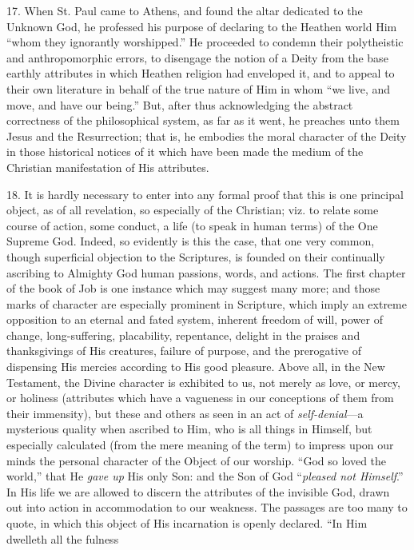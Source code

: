 17. When St. Paul came to Athens, and found the altar dedicated to
the Unknown God, he professed his purpose of declaring to the Heathen
world Him ``whom they ignorantly worshipped.'' He proceeded to
condemn their polytheistic and anthropomorphic errors, to disengage
the notion of a Deity from the base earthly attributes in which
Heathen religion had enveloped it, and to appeal to their own
literature in behalf of the true nature of Him in whom ``we live,
and move, and have our being.'' But, after thus acknowledging the
abstract correctness of the philosophical system, as far as it went,
he preaches unto them Jesus and the Resurrection; that is, he embodies
the moral character of the Deity in those historical notices of it
which have been made the medium of the Christian manifestation of His
attributes.

18. It is hardly necessary to enter into any formal proof that this
is one principal object, as of all revelation, so especially of the
Christian; viz. to relate some course of action, some conduct, a life
(to speak in human terms) of the One Supreme God. Indeed, so evidently
is this the case, that one very common, though superficial objection
to the Scriptures, is founded on their continually ascribing to
Almighty God human passions, words, and actions. The first chapter of
the book of Job is one instance which may suggest many more; and those
marks of character are especially prominent in Scripture, which imply
an extreme opposition to an eternal and fated system, inherent freedom
of will, power of change, long-suffering, placability, repentance,
delight in the praises and thanksgivings of His creatures, failure of
purpose, and the prerogative of dispensing His mercies according to
His good pleasure. Above all, in the New Testament, the Divine
character is exhibited to us, not merely as love, or mercy, or
holiness (attributes which have a vagueness in our conceptions of them
from their immensity), but these and others as seen in an act of \emph{self-denial}—a
mysterious quality when ascribed to Him, who is all things in Himself,
but especially calculated (from the mere meaning of the term) to
impress upon our minds the personal character of the Object of our
worship. ``God so loved the world,'' that He \emph{gave up}
His only Son: and the Son of God ``\emph{pleased not Himself}.''
In His life we are allowed to discern the attributes of the invisible
God, drawn out into action in accommodation to our weakness. The
passages are too many to quote, in which this object of His
incarnation is openly declared. ``In Him dwelleth all the fulness
